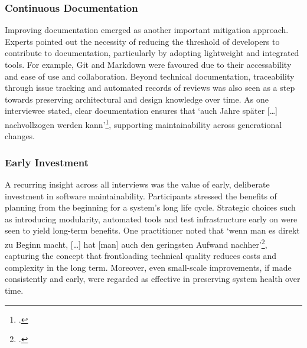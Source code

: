 \subsubsection{Continuous Documentation}
Improving documentation emerged as another important mitigation approach. Experts pointed out the necessity of reducing the threshold of developers to contribute to documentation, particularly by adopting lightweight and integrated tools. For example, Git and Markdown were favoured due to their accessability and ease of use and collaboration.
Beyond technical documentation, traceability through issue tracking and automated records of reviews was also seen as a step towards preserving architectural and design knowledge over time. As one interviewee stated, clear documentation ensures that `auch Jahre später [\ldots] nachvollzogen werden kann'\footcite{Interview22025}, supporting maintainability across generational changes.\\

\subsubsection{Early Investment}
A recurring insight across all interviews was the value of early, deliberate investment in software maintainability. Participants stressed the benefits of planning from the beginning for a system's long life cycle. Strategic choices such as introducing modularity, automated tools and test infrastructure early on were seen to yield long-term benefits.
One practitioner noted that `wenn man es direkt zu Beginn macht, [\ldots] hat [man] auch den geringsten Aufwand nachher'\footcite{Interview32025}, capturing the concept that frontloading technical quality reduces costs and complexity in the long term. Moreover, even small-scale improvements, if made consistently and early, were regarded as effective in preserving system health over time.\\

